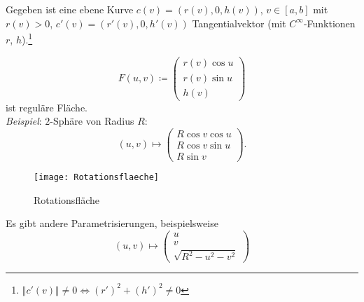 \begin{example}[Rotationsfläche]
  Gegeben ist eine ebene Kurve \( c(v) = \left( r(v), 0, h(v) \right) \), \( v \in [a,b] \) mit \( r(v) > 0 \), \( c'(v) = \left( r'(v), 0, h'(v) \right) \) Tangentialvektor (mit \( C^\infty \)-Funktionen \( r \), \( h \)).\footnote{\( \Vert c'(v) \Vert \neq 0 \Leftrightarrow {(r')}^2 + {(h')}^2 \neq 0 \)}

  \begin{minipage}{.45\textwidth}
    \begin{equation*}
      F(u,v) \coloneqq \begin{pmatrix}
        r(v)\cos u \\
        r(v)\sin u \\
        h(v)
      \end{pmatrix}
    \end{equation*}
    ist reguläre Fläche.\footnotemark{} \\
    \emph{Beispiel}: \( 2 \)-Sphäre von Radius \( R \):
    \begin{equation*}
      (u,v) \mapsto \begin{pmatrix}
        R\cos v \cos u \\
        R\cos v\sin u \\
        R\sin v
      \end{pmatrix}\text{.}
    \end{equation*}
  \end{minipage}
  \hfill
  \begin{minipage}{.45\textwidth}
    \begin{figure}[H]
      \texttt{[image: Rotationsflaeche]}
      \caption{Rotationsfläche}
    \end{figure}
  \end{minipage}

  Es gibt andere Parametrisierungen, beispielsweise
  \begin{equation*}
    (u,v) \mapsto \begin{pmatrix}
      u \\ v \\ \sqrt{R^2-u^2-v^2}
    \end{pmatrix}
  \end{equation*}
\end{example}

